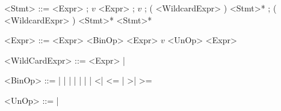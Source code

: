 
\begin{grammar}
	<Stmt> ::=  <Expr> ;
	\alt $v$ \gramr{:=} <Expr> ;
	\alt {} $v$ ;
	\alt {} ( <WildcardExpr> ) <Stmt>* ;
	\alt {} ( <WildcardExpr> ) <Stmt>*  <Stmt>*
	
	<Expr> ::= <Expr> <BinOp> <Expr>
	\alt $v$
	\alt <UnOp> <Expr>
	\alt {}
	\alt {}
	
	<WildCardExpr> ::= <Expr> | \gramr{*}
	
	<BinOp> ::= \gramr{+} | \gramr{-} | \gramr{$\cdot$} | \gramr{/} | \gramr{\%}
	\alt \gramr{\&\&} | \gramr{||} | \gramr{==} | \gramr{!=}
	\alt \textless | \textless= | \textgreater | \textgreater=
	
	<UnOp> ::= \gramr{-} | \gramr{!}
\end{grammar}